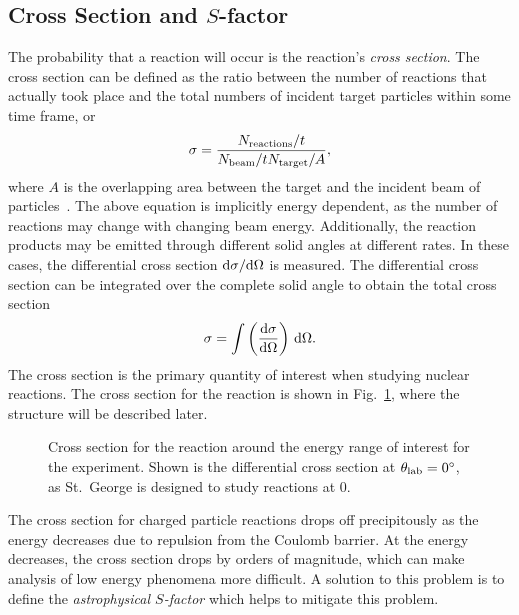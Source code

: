 \subsection{Cross Section and $S$-factor}

The probability that a reaction will occur is the reaction's
\emph{cross section}. The cross section can be defined as the ratio between the
number of reactions that actually took place and the total numbers of incident
target particles within some time frame, or
\[
    \sigma = \frac{N_{\rm{reactions}} / t}{N_{\rm{beam}} / t N_{\rm{target}} / A},
\]
where $A$ is the overlapping area between the target and the incident beam of
particles~\cite{Iliadis}. The above equation is implicitly energy dependent, as
the number of reactions may change with changing beam energy. Additionally, the
reaction products may be emitted through different solid angles at different
rates. In these cases, the differential cross section
$\rm{d}\sigma/\rm{d}\Omega$ is measured. The differential cross section can be
integrated over the complete solid angle to obtain the total cross section
\[
    \sigma = \int \left(\frac{\rm{d}\sigma}{\rm{d}\Omega}\right)\,\rm{d}\Omega.
\]
The cross section is the primary quantity of interest when studying nuclear
reactions. The cross section for the \alpa{} reaction is shown in
Fig.~\ref{fig:alpa-cross-section}, where the structure will be described later.

\begin{figure}[t]
    \begin{center}
        \label{fig:alpa-cross-section}
        \caption[Cross section for the \alpa{} reaction]{Cross section for the
            \alpa{} reaction around the energy range of interest for the
            experiment. Shown is the differential cross section at
            $\theta_{\rm{lab}} = 0\degree$, as St.\ George is designed to study
            reactions at 0\degree.}
    \end{center}
\end{figure}

The cross section for charged particle reactions drops off precipitously as
the energy decreases due to repulsion from the Coulomb barrier. At the energy
decreases, the cross section drops by orders of magnitude, which can make
analysis of low energy phenomena more difficult. A solution to this problem is
to define the \emph{astrophysical $S$-factor} which helps to mitigate this
problem.

